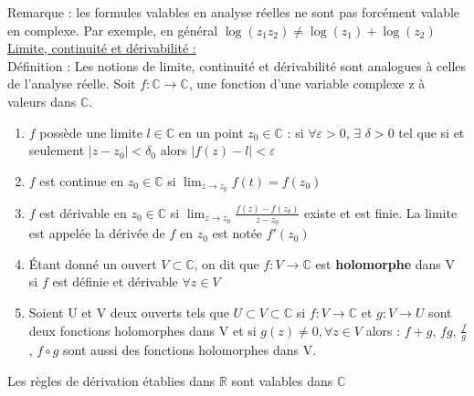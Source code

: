 \documentclass[../main.tex]{subfiles}
\begin{document}
\color{gray} Remarque : les formules valables en analyse réelles ne sont pas forcément valable en complexe. Par exemple, en général $\log(z_1z_2) \neq \log(z_1)+\log(z_2)$\color{black}\\

\quad \underline{Limite, continuité et dérivabilité :}\\
Définition : Les notions de limite, continuité et dérivabilité sont analogues à celles de l'analyse réelle. Soit $f:\mathbb{C}\rightarrow \mathbb{C}$, une fonction d'une variable complexe z à valeurs dans $\mathbb{C}$.\\
\begin{enumerate}
    \item $f$ possède une limite $l\in \mathbb{C}$ en un point $z_0 \in \mathbb{C}$ : si $\forall \varepsilon>0$, $\exists$ $\delta>0$ tel que si et seulement $\lvert z-z_0\rvert < \delta_0$ alors $\lvert f(z)-l\rvert < \varepsilon$\\
    \item $f$ est continue en $z_0\in \mathbb{C}$ si $\lim_{z\rightarrow z_0}f(t) = f(z_0)$\\
    \item $f$ est dérivable en $z_0 \in \mathbb{C}$ si $\lim_{z\rightarrow z_0} \frac{f(z)-f(z_0)}{z-z_0}$ existe et est finie. La limite est appelée la dérivée de $f$ en $z_0$ est notée $f'(z_0)$\\
    \item Étant donné un ouvert $V\subset \mathbb{C}$, on dit que $f:V\rightarrow \mathbb{C}$ est \textbf{holomorphe} dans V si $f$ est définie et dérivable $\forall z \in V$\\
    \item Soient U et V deux ouverts tels que $U \subset V \subset \mathbb{C}$ si $f:V\rightarrow \mathbb{C}$ et $g:V\rightarrow U$ sont deux fonctions holomorphes dans V et si $g(z) \neq 0, \forall z\in V$ alors : $f+g$, $fg$, $\frac{f}{g}$, $f\circ g$ sont aussi des fonctions holomorphes dans V.\\
\end{enumerate}

\color{gray} Les règles de dérivation établies dans $\mathbb{R}$ sont valables dans $\mathbb{C}$\color{black}\\
\end{document}

